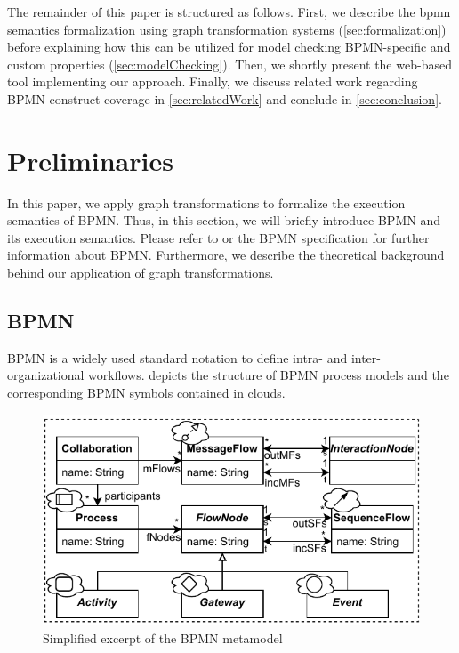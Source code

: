 \documentclass[submission, copyright, creativecommons]{eptcs}
\begin{document}
The remainder of this paper is structured as follows.
First, we describe the \gls*{bpmn} semantics formalization using graph transformation systems (\cref{sec:formalization}) before explaining how this can be utilized for model checking BPMN-specific and custom properties (\cref{sec:modelChecking}).
Then, we shortly present the web-based tool implementing our approach.
Finally, we discuss related work regarding BPMN construct coverage in \cref{sec:relatedWork} and conclude in \cref{sec:conclusion}.

\section{Preliminaries}
In this paper, we apply graph transformations to formalize the execution semantics of BPMN.
Thus, in this section, we will briefly introduce BPMN and its execution semantics.
Please refer to \cite{freundRealLifeBPMNUsing2019} or the BPMN specification \cite{objectmanagementgroupBusinessProcessModel2013} for further information about BPMN.
Furthermore, we describe the theoretical background behind our application of graph transformations.
\subsection{BPMN}
BPMN  is a widely used standard notation to define intra- and inter-organizational workflows.
 depicts the structure of BPMN process models and the corresponding BPMN symbols contained in clouds.

\begin{figure}[h]
  \centering
  \includegraphics[width=0.75\linewidth]{images/bpmn_semantics-bpmn-metamodel.pdf}
  \caption{Simplified excerpt of the BPMN metamodel \cite{objectmanagementgroupBusinessProcessModel2013}}
  \label{fig:bpmnMetamodel}
\end{figure}
\end{document}
